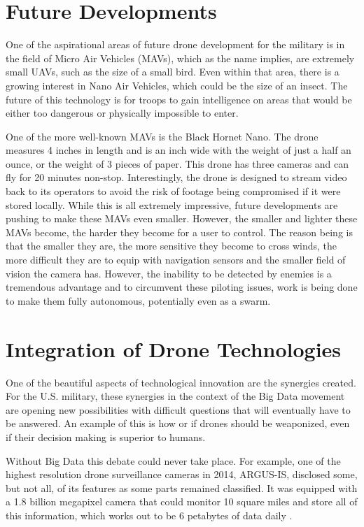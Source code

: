\documentclass[sigconf]{acmart}
\begin{document}
\section{Future Developments}
One of the aspirational areas of future drone development for the military is in the field of Micro Air Vehicles (MAVs), which as the name implies, are extremely small UAVs, such as the size of a small bird. Even within that area, there is a growing interest in Nano Air Vehicles, which could be the size of an insect. The future of this technology is for troops to gain intelligence on areas that would be either too dangerous or physically impossible to enter. 

One of the more well-known MAVs is the Black Hornet Nano. The drone measures 4 inches in length and is an inch wide with the weight of just a half an ounce, or the weight of 3 pieces of paper. This drone has three cameras and can fly for 20 minutes non-stop. Interestingly, the drone is designed to stream video back to its operators to avoid the risk of footage being compromised if it were stored locally. While this is all extremely impressive, future developments are pushing to make these MAVs even smaller. However, the smaller and lighter these MAVs become, the harder they become for a user to control. The reason being is that the smaller they are, the more sensitive they become to cross winds, the more difficult they are to equip with navigation sensors and the smaller field of vision the camera has. However, the inability to be detected by enemies is a tremendous advantage and to circumvent these piloting issues, work is being done to make them fully autonomous, potentially even as a swarm. 

\section{Integration of Drone Technologies}

One of the beautiful aspects of technological innovation are the synergies created. For the U.S. military, these synergies in the context of the Big Data movement are opening new possibilities with difficult questions that will eventually have to be answered. An example of this is how or if drones should be weaponized, even if their decision making is superior to humans. 

Without Big Data this debate could never take place. For example, one of the highest resolution drone surveillance cameras in 2014, ARGUS-IS, disclosed some, but not all, of its features as some parts remained classified. It was equipped with a 1.8 billion megapixel camera that could monitor 10 square miles and store all of this information, which works out to be 6 petabytes of data daily \cite{argus}. 
\end{document}
